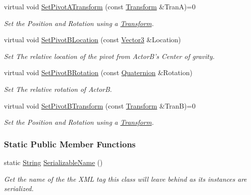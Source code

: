 \begin{DoxyCompactItemize}
virtual void \hyperlink{classMezzanine_1_1DualTransformConstraint_a6f1713e6af9d89de70ff77ed47c82d31}{SetPivotATransform} (const \hyperlink{classMezzanine_1_1Transform}{Transform} \&TranA)=0
\begin{DoxyCompactList}\small\item\em Set the Position and Rotation using a \hyperlink{classMezzanine_1_1Transform}{Transform}. \item\end{DoxyCompactList}\item 
virtual void \hyperlink{classMezzanine_1_1DualTransformConstraint_abf63fe4c4fc3c57a0eed7ed006a00aee}{SetPivotBLocation} (const \hyperlink{classMezzanine_1_1Vector3}{Vector3} \&Location)
\begin{DoxyCompactList}\small\item\em Set The relative location of the pivot from ActorB's Center of gravity. \item\end{DoxyCompactList}\item 
virtual void \hyperlink{classMezzanine_1_1DualTransformConstraint_ab25460e03f187dd56657e43e6302ef45}{SetPivotBRotation} (const \hyperlink{classMezzanine_1_1Quaternion}{Quaternion} \&Rotation)
\begin{DoxyCompactList}\small\item\em Set The relative rotation of ActorB. \item\end{DoxyCompactList}\item 
virtual void \hyperlink{classMezzanine_1_1DualTransformConstraint_ac5ee69ce5d68f4e299e7916f764ee396}{SetPivotBTransform} (const \hyperlink{classMezzanine_1_1Transform}{Transform} \&TranB)=0
\begin{DoxyCompactList}\small\item\em Set the Position and Rotation using a \hyperlink{classMezzanine_1_1Transform}{Transform}. \item\end{DoxyCompactList}\end{DoxyCompactItemize}
\subsubsection*{Static Public Member Functions}
\begin{DoxyCompactItemize}
\item 
static \hyperlink{namespaceMezzanine_acf9fcc130e6ebf08e3d8491aebcf1c86}{String} \hyperlink{classMezzanine_1_1DualTransformConstraint_a78694da6df0b2625220abb94e8f1c549}{SerializableName} ()
\begin{DoxyCompactList}\small\item\em Get the name of the the XML tag this class will leave behind as its instances are serialized. \item\end{DoxyCompactList}\end{DoxyCompactItemize}


